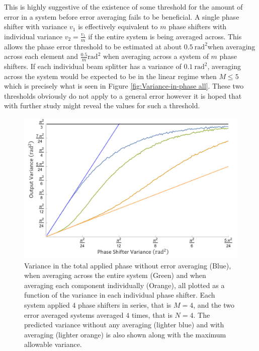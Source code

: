\documentclass[aps,pra,twocolumn,superscriptaddress,numerical]{revtex4-1}
\begin{document}
		This is highly suggestive of the existence of some threshold for the amount of error in a system before error averaging fails to be beneficial. A single phase shifter with variance $v_{1}$ is effectively equivalent to $m$ phase shifters with individual variance $v_{2}=\frac{v_{1}}{m}$ if the entire system is being averaged across. This allows the phase error threshold to be estimated at about $0.5\ \textrm{rad}^{2}$when averaging across each element and $\frac{0.5}{m}\textrm{rad}^{2}$ when averaging across a system of $m$ phase shifters. If each individual beam splitter has a variance of $0.1\ \textrm{rad}^{2}$, averaging across the system would be expected to be in the linear regime when $M\le5$ which is precisely what is seen in Figure \ref{fig:Variance-in-phase all}. These two thresholds obviously do not apply to a general error however it is hoped that with further study might reveal the values for such a threshold.
		
		\begin{figure}
			\begin{centering}
				\includegraphics[width=\columnwidth]{variance(variance).png}
				\par\end{centering}
			
			\caption[Variance of the total applied phase as a function of the number of	individual component variance. ]{Variance in the total applied phase without error averaging (Blue), when averaging across the entire system (Green) and when averaging each component individually (Orange), all plotted as a function of the variance in each individual phase shifter. Each system applied $4$ phase shifters in series, that is $M=4$, and the two error averaged systems averaged $4$ times, that is $N=4$. The predicted variance without any averaging (lighter blue) and with averaging (lighter orange) is also shown along with the maximum allowable variance. \label{fig:Variance(veriance)}}
			
			
		\end{figure}
		
\end{document}
